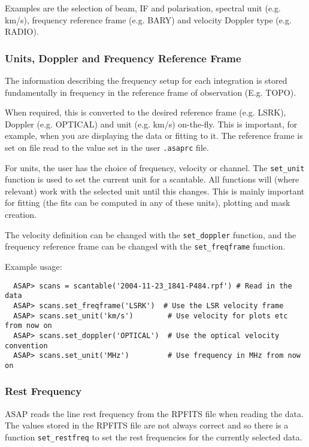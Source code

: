 \documentclass[11pt]{article}
\newcommand{\cmd}[1]{{\tt #1}}
\begin{document}
Examples are the selection of beam, IF and polarisation,  spectral unit
(e.g. km/s), frequency reference frame (e.g. BARY) and velocity Doppler
type (e.g. RADIO).

\subsubsection{Units, Doppler and Frequency Reference Frame}

The information describing the frequency setup for each integration
is stored fundamentally in frequency in the reference frame
of observation (E.g. TOPO).

When required, this is converted to the desired reference frame
(e.g. LSRK), Doppler (e.g. OPTICAL) and unit (e.g. km/s) on-the-fly.
This is important, for example, when you are displaying the data or
fitting to it. The reference frame is set on file read to the value
set in the user \cmd{.asaprc} file.

For units, the user has the choice of frequency, velocity or channel.
The \cmd{set\_unit} function is used to set the current unit for a
scantable. All functions will (where relevant) work with the selected
unit until this changes. This is mainly important for fitting (the fits
can be computed in any of these units), plotting and mask creation.

The velocity definition can be changed with the \cmd{set\_doppler}
function, and the frequency reference frame can be changed with the
\cmd{set\_freqframe} function.

Example usage:

\begin{verbatim}
  ASAP> scans = scantable('2004-11-23_1841-P484.rpf') # Read in the data
  ASAP> scans.set_freqframe('LSRK')  # Use the LSR velocity frame
  ASAP> scans.set_unit('km/s')        # Use velocity for plots etc from now on
  ASAP> scans.set_doppler('OPTICAL')  # Use the optical velocity convention
  ASAP> scans.set_unit('MHz')         # Use frequency in MHz from now on
\end{verbatim}


\subsubsection{Rest Frequency}

ASAP reads the line rest frequency
from the RPFITS file when reading the data. The values stored in the
RPFITS file are not always correct and so there is a function
\cmd{set\_restfreq} to set the rest frequencies for the currently
selected data.
\end{document}
